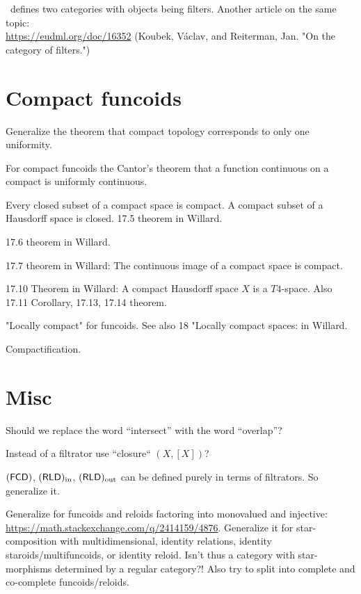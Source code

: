 \documentclass{amsart}
\begin{document}
\cite{filt-cat}~defines two categories with objects being filters. Another article on the same topic:\\
\url{https://eudml.org/doc/16352} (Koubek, V\'aclav, and Reiterman, Jan. "On the category of filters.")


\section{Compact funcoids}

Generalize the theorem that compact topology corresponds to only one uniformity.

For compact funcoids the Cantor's theorem that a function continuous on a compact is uniformly continuous.

Every closed subset of a compact space is compact. A compact subset of a Hausdorff space is closed. 17.5 theorem in Willard.

17.6 theorem in Willard.

17.7 theorem in Willard: The continuous image of a compact space is compact.

17.10 Theorem in Willard: A compact Hausdorff space $X$ is a $T 4$-space. Also 17.11 Corollary, 17.13, 17.14 theorem.

"Locally compact" for funcoids. See also 18 "Locally compact spaces: in Willard.

Compactification.

\section{Misc}

Should we replace the word ``intersect'' with the word ``overlap''?

Instead of a filtrator use ``closure`` $(X,[X])$?

$(\mathsf{FCD})$, $(\mathsf{RLD})_{\mathrm{in}}$, $(\mathsf{RLD})_{\mathrm{out}}$ can be defined purely in terms of filtrators.
So generalize it.

Generalize for funcoids and reloids factoring into monovalued and injective:\\
\url{https://math.stackexchange.com/q/2414159/4876}.
Generalize it for star-composition with multidimensional, identity relations, identity staroids/multifuncoids, or identity reloid.
Isn't thus a category with star-morphisms determined by a regular category?!
Also try to split into complete and co-complete funcoids/reloids.
\end{document}
